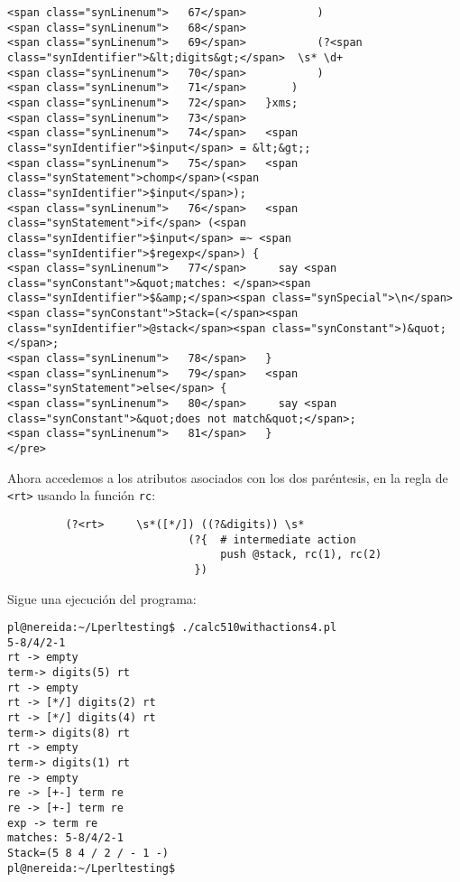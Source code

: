 \begin{verbatim}
<span class="synLinenum">   67</span>           )
<span class="synLinenum">   68</span> 
<span class="synLinenum">   69</span>           (?<span class="synIdentifier">&lt;digits&gt;</span>  \s* \d+
<span class="synLinenum">   70</span>           )
<span class="synLinenum">   71</span>       )
<span class="synLinenum">   72</span>   }xms;
<span class="synLinenum">   73</span> 
<span class="synLinenum">   74</span>   <span class="synIdentifier">$input</span> = &lt;&gt;;
<span class="synLinenum">   75</span>   <span class="synStatement">chomp</span>(<span class="synIdentifier">$input</span>);
<span class="synLinenum">   76</span>   <span class="synStatement">if</span> (<span class="synIdentifier">$input</span> =~ <span class="synIdentifier">$regexp</span>) {
<span class="synLinenum">   77</span>     say <span class="synConstant">&quot;matches: </span><span class="synIdentifier">$&amp;</span><span class="synSpecial">\n</span><span class="synConstant">Stack=(</span><span class="synIdentifier">@stack</span><span class="synConstant">)&quot;</span>;
<span class="synLinenum">   78</span>   }
<span class="synLinenum">   79</span>   <span class="synStatement">else</span> {
<span class="synLinenum">   80</span>     say <span class="synConstant">&quot;does not match&quot;</span>;
<span class="synLinenum">   81</span>   }
</pre>

\end{verbatim}

Ahora accedemos a los atributos asociados con los dos paréntesis,
en la regla de \verb|<rt>| usando la función \verb|rc|:

\begin{verbatim}
         (?<rt>     \s*([*/]) ((?&digits)) \s*
                            (?{  # intermediate action
                                 push @stack, rc(1), rc(2)
                             })
\end{verbatim}

Sigue una ejecución del programa:

\begin{verbatim}
pl@nereida:~/Lperltesting$ ./calc510withactions4.pl
5-8/4/2-1
rt -> empty
term-> digits(5) rt
rt -> empty
rt -> [*/] digits(2) rt
rt -> [*/] digits(4) rt
term-> digits(8) rt
rt -> empty
term-> digits(1) rt
re -> empty
re -> [+-] term re
re -> [+-] term re
exp -> term re
matches: 5-8/4/2-1
Stack=(5 8 4 / 2 / - 1 -)
pl@nereida:~/Lperltesting$
\end{verbatim}


